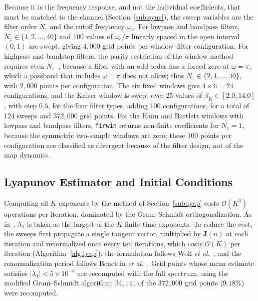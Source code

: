 \documentclass[journal]{IEEEtran}
\begin{document}
Because it is the frequency response, and not the individual coefficients,
that must be matched to the channel (Section~\ref{sub:sync}), the sweep
variables are the filter order $N_z$ and the cutoff frequency $\omega_c$. For
lowpass and bandpass filters, $N_z\in\{1,2,\ldots,40\}$ and 100 values of
$\omega_c/\pi$ linearly spaced in the open interval $(0,1)$ are swept, giving
$4{,}000$ grid points per window--filter configuration. For highpass and
bandstop filters, the parity restriction of the window method requires even
$N_z$~\cite{Oppenheim2009}, because a filter with an odd order has a forced
zero at $\omega=\pi$, which a passband that includes $\omega=\pi$ does not
allow; thus
$N_z\in\{2,4,\ldots,40\}$, with $2{,}000$ points per configuration. The six
fixed windows give $4\times6=24$ configurations, and the Kaiser window is
swept over 25 values of $\beta_K\in[2.0,14.0]$, with step $0.5$, for the four
filter types, adding 100 configurations, for a total of 124 sweeps and
$372{,}000$ grid points. For the Hann and Bartlett windows with lowpass and
bandpass filters, \texttt{firwin} returns non-finite coefficients for $N_z=1$, because the
symmetric two-sample windows are zero; these 100 points per configuration are
classified as divergent because of the filter design, not of the map dynamics.

\subsection{Lyapunov Estimator and Initial Conditions}\label{sub:estimator}
Computing all $K$ exponents by the method of Section~\ref{sub:lyap} costs
$\mathcal{O}(K^3)$ operations per iteration, dominated by the Gram--Schmidt
orthogonalization. As in~\cite{BorgesCNSNS2024}, $\lambda_1$ is taken as the
largest of the $K$ finite-time exponents. To reduce the cost, the sweeps first
propagate a single tangent vector, multiplied by $\mathbf{J}(n)$ at each
iteration and renormalized once every ten iterations, which costs
$\mathcal{O}(K)$ per iteration (Algorithm~\ref{alg:lyap}); the formulation
follows Wolf \textit{et al.}~\cite{Wolf1985}, and the renormalization period
follows Benettin \textit{et al.}~\cite{Benettin1980a,Benettin1980b}. Grid points
whose mean estimate satisfies $|\lambda_1|<5\times10^{-3}$ are recomputed with
the full spectrum, using the modified Gram--Schmidt algorithm; $34{,}141$ of the
$372{,}000$ grid points ($9.18\%$) were recomputed.
\end{document}
